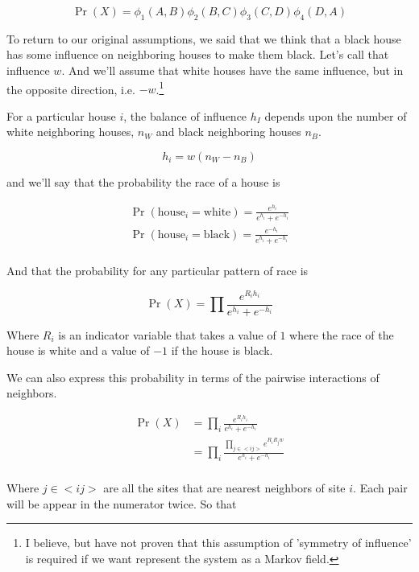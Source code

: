 \documentclass{article}
\begin{document}
\begin{equation}
\Pr(X) = \phi_1(A,B)\phi_2(B,C)\phi_3(C,D)\phi_4(D,A) 
\end{equation}


 
To return to our original assumptions, we said that we think that a
black house has some influence on neighboring houses to make them
black. Let's call that influence $w$. And we'll assume that white
houses have the same influence, but in the opposite direction,
i.e. $-w$.\footnote{I believe, but have not proven that this
  assumption of 'symmetry of influence' is required if we want
  represent the system as a Markov field.}


For a particular house $i$, the balance of influence $h_I$ depends upon the
number of white neighboring houses, $n_W$ and black neighboring houses $n_B$.

\begin{equation}
h_i = w(n_W - n_B)
\end{equation}

and we'll say that the probability the race of a house is

\begin{align}
\Pr(\text{house}_i = \text{white}) = \frac{e^{h_i}}{e^{h_i} + e^{-h_i}} \\
\Pr(\text{house}_i = \text{black}) = \frac{e^{-h_i}}{e^{h_i} + e^{-h_i}} \\
\end{align}

And that the probability for any particular pattern of race is

\begin{equation}
\Pr(X) = \prod\frac{e^{R_ih_i}}{e^{h_i} + e^{-h_i}}
\end{equation}

Where $R_i$ is an indicator variable that takes a value of
$1$ where the race of the house is white and a value of $-1$ if the
house is black.

We can also express this probability in terms of the pairwise interactions 
of neighbors.

\begin{align}
\Pr(X) &= \prod_i\frac{e^{R_ih_i}}{e^{h_i} + e^{-h_i}} \\
&= \prod_i\frac{\prod_{j \in <i j>}e^{R_iR_jw}}{e^{h_i} + e^{-h_i}} \\
\end{align}

Where $j \in <i j>$ are all the sites that are nearest neighbors of site $i$. Each pair will be appear in the numerator twice. So that 
\end{document}
